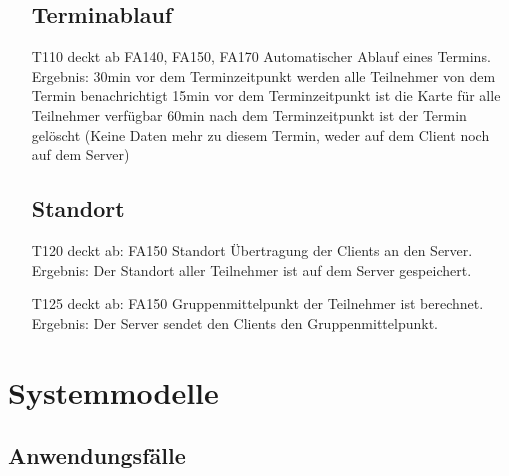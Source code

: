 \documentclass{scrartcl}
\begin{document}
\begin{itemize}
	\subsection{Terminablauf}
	
		\item[T110] deckt ab FA140, FA150, FA170 \newline
		Automatischer Ablauf eines Termins. \newline
		Ergebnis: 30min vor dem Terminzeitpunkt werden alle \gls{Teilnehmer} von dem Termin benachrichtigt  \newline
			15min vor dem Terminzeitpunkt ist die Karte für alle Teilnehmer verfügbar  \newline
			60min nach dem Terminzeitpunkt ist der Termin gelöscht (Keine Daten mehr zu diesem Termin, weder auf 					dem \gls{Client} noch auf dem \gls{Server})

	\subsection{Standort}
		\item[T120] deckt ab: FA150 \newline
		Standort Übertragung der Clients an den \gls{Server}.  \newline
		Ergebnis: Der Standort aller \gls{Teilnehmer} ist auf dem Server gespeichert.

		\item[T125]  deckt ab: FA150 \newline
		Gruppenmittelpunkt der \gls{Teilnehmer} ist berechnet. \newline
		Ergebnis: Der \gls{Server} sendet den Clients den Gruppenmittelpunkt.

	\end{itemize}	
	
	\newpage
	
	
	\section{Systemmodelle}
	
	\subsection{Anwendungsfälle}
\end{document}
